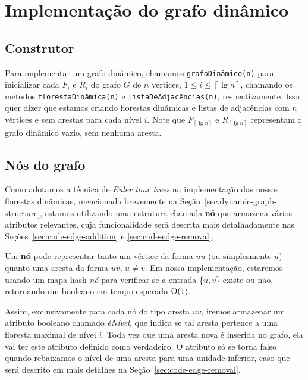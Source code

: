 \newpage

\section{Implementação do grafo dinâmico}
\label{sec:dynamic-graph-implementation}

\subsection{Construtor}
\label{sec:code-constructor}

Para implementar um grafo dinâmico, chamamos \texttt{grafoDinâmico(n)} para inicializar cada $F_i$ e $R_i$ do grafo $G$ de $n$ vértices, $1 \leq i \leq \left\lceil \lg n \right\rceil$, chamando os métodos \texttt{florestaDinâmica(n)} e \texttt{listaDeAdjacências(n)}, respectivamente. Isso quer dizer que estamos criando florestas dinâmicas e listas de adjacências com $n$ vértices e sem arestas para cada nível $i$. Note que $F_{\left\lceil \lg n \right\rceil}$ e $R_{\left\lceil \lg n \right\rceil}$ representam o grafo dinâmico vazio, sem nenhuma aresta. 


\subsection{Nós do grafo}
\label{sec:graph-nodes}

Como adotamos a técnica de \textit{Euler tour trees} na implementação das nossas florestas dinâmicas, mencionada brevemente na Seção~\ref{sec:dynamic-graph-structure}, estamos utilizando uma estrutura chamada \textbf{nó} que armazena vários atributos relevantes, cuja funcionalidade será descrita mais detalhadamente nas Seções~\ref{sec:code-edge-addition} e \ref{sec:code-edge-removal}. 

Um \textbf{nó} pode representar tanto um vértice da forma $uu$ (ou simplesmente $u$) quanto uma aresta da forma $uv$, $u \neq v$. Em nossa implementação, estaremos usando um mapa hash \textit{nó} para verificar se a entrada \{$u, v$\} existe ou não, retornando um booleano em tempo esperado $\mathrm{O}(1)$.

Assim, exclusivamente para cada nó do tipo aresta $uv$, iremos armazenar um atributo booleano chamado \textit{éNível}, que indica se tal aresta pertence a uma floresta maximal de nível $i$. Toda vez que uma aresta nova é inserida no grafo, ela vai ter este atributo definido como verdadeiro. O atributo só se torna falso quando rebaixamos o nível de uma aresta para uma unidade inferior, caso que será descrito em mais detalhes na Seção~\ref{sec:code-edge-removal}. 

